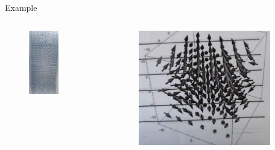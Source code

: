 \documentclass{beamer}
\begin{document}
\begin{frame}{Example}
    \begin{columns}
        \begin{column}{0.5\linewidth}
            \begin{figure}[htbp]
                \centering
                \includegraphics[width=0.6\textwidth]{img/mag2.jpg}
            \end{figure}
        \end{column}
        \begin{column}{0.5\linewidth}
            \begin{figure}[htbp]
                \centering
                \includegraphics[width=0.9\textwidth]{img/mag1.jpg}

\end{figure}
\end{column}
\end{columns}
\end{frame}
\end{document}
